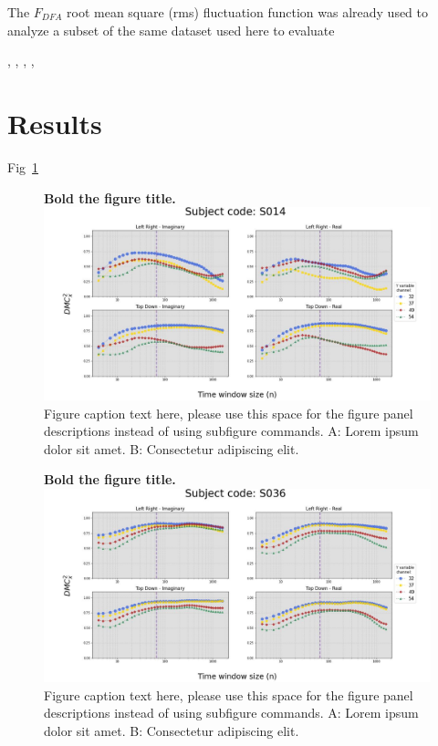 \documentclass[10pt,letterpaper]{article}
\newcommand{\fdfa}{\(F_{DFA}\) }
\begin{document}
The \fdfa root mean square (rms) fluctuation function was already used to analyze a subset of the same dataset used here to evaluate   \cite{Mesquita2019} \cite{OliveiraFilho2019} \cite{OliveiraFilho2021}


\cite{Peng1994, Buldyrev1950}, \cite{Podobnik2008}, \cite{Zebende2011}, \cite{PhysRevE.84.066118}, 


\section*{Results}

Fig~\ref{fig1} 

\begin{figure}[!h]
\caption{{\bf Bold the figure title.}
\includegraphics[width=.9\textwidth]{../output/figs/stats/S014.jpg}
Figure caption text here, please use this space for the figure panel descriptions instead of using subfigure commands. A: Lorem ipsum dolor sit amet. B: Consectetur adipiscing elit.}
\label{fig1}
\end{figure}

\begin{figure}[!h]
  \caption{{\bf Bold the figure title.}
  \includegraphics[width=.9\textwidth]{../output/figs/stats/S036.jpg}
  Figure caption text here, please use this space for the figure panel descriptions instead of using subfigure commands. A: Lorem ipsum dolor sit amet. B: Consectetur adipiscing elit.}
  \label{fig36}
\end{figure}
\end{document}
